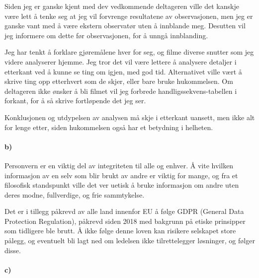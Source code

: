 \documentclass{../../myassignment}
\begin{document}
		Siden jeg er ganske kjent med dev vedkommende deltageren ville det kanskje v{\ae}re lett {\aa} tenke seg at jeg vil forvrenge resultatene av observasjonen, men jeg er ganske vant med {\aa} v{\ae}re ekstern observat{\o}r uten {\aa} innblande meg. Desutten vil jeg informere om dette f{\o}r observasjonen, for {\aa} unng{\aa} innblanding.

		Jeg har tenkt {\aa} forklare gj{\o}rem{\aa}lene hver for seg, og filme diverse snutter som jeg videre analyserer hjemme. Jeg tror det vil v{\ae}re lettere {\aa} analysere detaljer i etterkant ved {\aa} kunne se ting om igjen, med god tid. Alternativet ville v{\ae}rt {\aa} skrive ting opp etterhvert som de skjer, eller bare bruke hukommelsen. Om deltageren ikke {\o}nsker {\aa} bli filmet vil jeg forbrede handligssekvens-tabellen i forkant, for {\aa} s{\aa} skrive fortl{\o}pende det jeg ser. 

		Konklusjonen og utdypelsen av analysen m{\aa} skje i etterkant uansett, men ikke alt for lenge etter, siden hukommelsen ogs{\aa} har et betydning i helheten.


	\newpage

	\paragraph*{b)}

	Personvern er en viktig del av integriteten til alle og enhver. {\AA} vite hvilken informasjon av en selv som blir brukt av andre er viktig for mange, og fra et filosofisk standspunkt ville det ver uetisk {\aa} bruke informasjon om andre uten deres modne, fullverdige, og frie sammtykelse. 

	Det er i tillegg p{\aa}krevd av alle land innenfor EU {\aa} f{\o}lge GDPR (General Data Protection Regulation), p{\aa}krevd siden 2018 med bakgrunn p{\aa} etiske prinsipper som tidligere ble brutt. {\AA} ikke f{\o}lge denne loven kan risikere selskapet store p{\aa}legg, og eventuelt bli lagt ned om ledelsen ikke tilrettelegger l{\o}sninger, og f{\o}lger disse.

	\paragraph*{c)}
\end{document}

